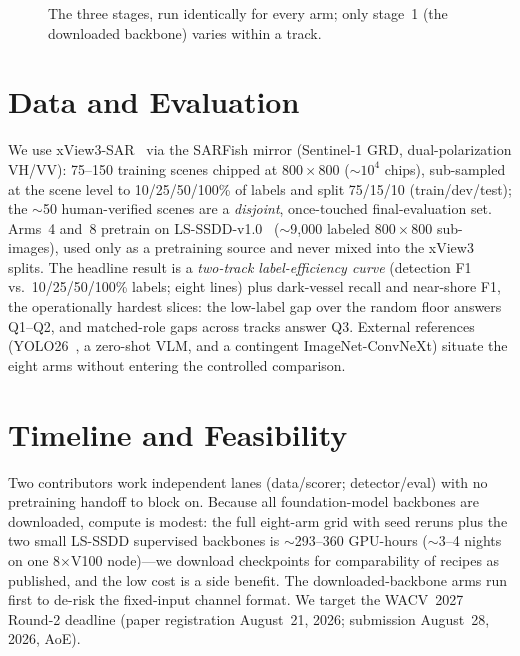 \documentclass[10pt,twocolumn,letterpaper]{article}
\begin{document}
\begin{figure}[t]
\centering
{}
\caption{The three stages, run identically for every arm; only stage~1 (the
downloaded backbone) varies within a track.}
\label{fig:pipeline}
\end{figure}

\section{Data and Evaluation}
\label{sec:data}
We use xView3-SAR~\cite{paolo2022xview3} via the SARFish mirror (Sentinel-1 GRD,
dual-polarization VH/VV): 75--150 training scenes chipped at $800\times800$
($\sim$$10^4$ chips), sub-sampled at the scene level to 10/25/50/100\% of labels
and split 75/15/10 (train/dev/test); the $\sim$50 human-verified scenes are a
\emph{disjoint}, once-touched final-evaluation set. Arms~4 and~8 pretrain on
LS-SSDD-v1.0~\cite{zhang2020lsssdd} ($\sim$9{,}000 labeled $800\times800$
sub-images), used only as a pretraining source and never mixed into the xView3
splits. The headline result is a \emph{two-track label-efficiency curve}
(detection F1 vs.\ 10/25/50/100\% labels; eight lines) plus dark-vessel recall
and near-shore F1, the operationally hardest slices: the low-label gap over the
random floor answers Q1--Q2, and matched-role gaps across tracks answer Q3.
External references (YOLO26~\cite{jocher2026yolo26}, a zero-shot VLM, and a
contingent ImageNet-ConvNeXt) situate the eight arms without entering the
controlled comparison.

\section{Timeline and Feasibility}
\label{sec:timeline}
Two contributors work independent lanes (data/scorer; detector/eval) with no
pretraining handoff to block on. Because all foundation-model backbones are
downloaded, compute is modest: the full eight-arm grid with seed reruns plus the
two small LS-SSDD supervised backbones is $\sim$293--360 GPU-hours ($\sim$3--4
nights on one 8$\times$V100 node)---we download checkpoints for comparability of
recipes as published, and the low cost is a side benefit. The
downloaded-backbone arms run first to de-risk the fixed-input channel format. We
target the WACV~2027 Round-2 deadline (paper registration August~21, 2026;
submission August~28, 2026, AoE).

{
    \small
    
    
}
\end{document}

